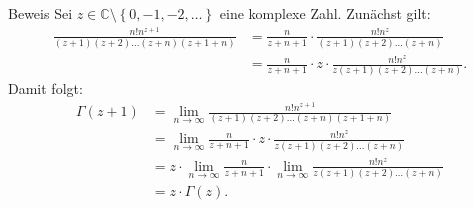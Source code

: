 \documentclass[10pt]{beamer}
\def\bC{\mathbb{C}}
\begin{document}
\begin{frame}{Beweis}
    Sei \( z \in \bC \setminus \left\{ 0, -1, -2, \ldots \right\} \) eine komplexe Zahl. Zunächst gilt:
    \begin{align*}
        \frac{n! n^{z + 1}}{\left( z + 1 \right) \left( z + 2 \right) \ldots \left( z + n \right) \left( z + 1 + n \right)}
        & = \frac{n}{z + n + 1} \cdot \frac{n! n^{z}}{\left( z + 1 \right) \left( z + 2 \right) \ldots \left( z + n \right)} \\
        & = \frac{n}{z + n + 1} \cdot z \cdot \frac{n! n^{z}}{z \left( z + 1 \right) \left( z + 2 \right) \ldots \left( z + n \right)}.
    \end{align*}
    Damit folgt:
    \begin{align*}
        \Gamma\left( z + 1 \right)
        & = \lim_{n \to \infty} \frac{n! n^{z + 1}}{\left( z + 1 \right) \left( z + 2 \right) \ldots \left( z + n \right) \left( z + 1 + n \right)} \\
        & = \lim_{n \to \infty} \frac{n}{z + n + 1} \cdot z \cdot \frac{n! n^{z}}{z \left( z + 1 \right) \left( z + 2 \right) \ldots \left( z + n \right)} \\
        & = z \cdot \lim_{n \to \infty} \frac{n}{z + n + 1} \cdot \lim_{n \to \infty} \frac{n! n^{z}}{z \left( z + 1 \right) \left( z + 2 \right) \ldots \left( z + n \right)} \\
        & = z \cdot \Gamma\left( z \right).
    \end{align*}
\end{frame}
\end{document}
